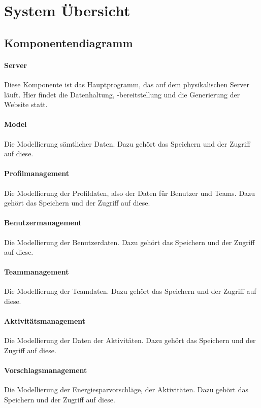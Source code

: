 \section{System \"Ubersicht}

\subsection{Komponentendiagramm}

\paragraph{Server} Diese Komponente ist das Hauptprogramm, das auf dem physikalischen Server läuft. Hier findet die Datenhaltung, -bereitstellung und die Generierung der Website statt.

\paragraph{Model} Die Modellierung sämtlicher Daten. Dazu gehört das Speichern und der Zugriff auf diese.

\paragraph{Profilmanagement} Die Modellierung der Profildaten, also der Daten für Benutzer und Teams. Dazu gehört das Speichern und der Zugriff auf diese.

\paragraph{Benutzermanagement} Die Modellierung der Benutzerdaten. Dazu gehört das Speichern und der Zugriff auf diese.

\paragraph{Teammanagement} Die Modellierung der Teamdaten. Dazu gehört das Speichern und der Zugriff auf diese.

\paragraph{Aktivitätsmanagement} Die Modellierung der Daten der Aktivitäten. Dazu gehört das Speichern und der Zugriff auf diese.

\paragraph{Vorschlagsmanagement}  Die Modellierung der Energiesparvorschläge, der Aktivitäten. Dazu gehört das Speichern und der Zugriff auf diese.


